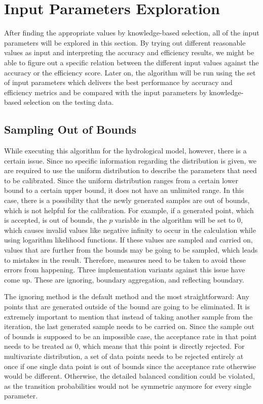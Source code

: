 \section{Input Parameters Exploration}
After finding the appropriate values by knowledge-based selection, all of the input parameters will be explored in this section. By trying out different reasonable values as input and interpreting the accuracy and efficiency results, we might be able to figure out a specific relation between the different input values against the accuracy or the efficiency score. Later on, the algorithm will be run using the set of input parameters which delivers the best performance by accuracy and efficiency metrics and be compared with the input parameters by knowledge-based selection on the testing data.

\subsection{Sampling Out of Bounds}
While executing this algorithm for the hydrological model, however, there is a certain issue. Since no specific information regarding the distribution is given, we are required to use the uniform distribution to describe the parameters that need to be calibrated. Since the uniform distribution ranges from a certain lower bound to a certain upper bound, it does not have an unlimited range. In this case, there is a possibility that the newly generated samples are out of bounds, which is not helpful for the calibration. For example, if a generated point, which is accepted, is out of bounds, the $p$ variable in the algorithm will be set to 0, which causes invalid values like negative infinity to occur in the calculation while using logarithm likelihood functions. If these values are sampled and carried on, values that are further from the bounds may be going to be sampled, which leads to mistakes in the result. Therefore, measures need to be taken to avoid these errors from happening. Three implementation variants against this issue have come up. These are ignoring, boundary aggregation, and reflecting boundary.

The ignoring method is the default method and the most straightforward: Any points that are generated outside of the bound are going to be eliminated. It is extremely important to mention that instead of taking another sample from the iteration, the last generated sample needs to be carried on. Since the sample out of bounds is supposed to be an impossible case, the acceptance rate in that point needs to be treated as 0, which means that this point is directly rejected. For multivariate distribution, a set of data points needs to be rejected entirely at once if one single data point is out of bounds since the acceptance rate otherwise would be different. Otherwise, the detailed balanced condition could be violated, as the transition probabilities would not be symmetric anymore for every single parameter.

